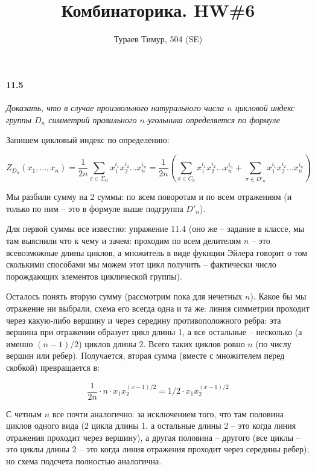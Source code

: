 \documentclass[russian]{article}
\begin{document}
\title{Комбинаторика. HW\#6}
\author{Тураев Тимур, 504 (SE)}
\maketitle

\paragraph*{11.5}

\textit{Доказать, что в случае произвольного натурального числа $n$ цикловой индекс группы $D_n$ симметрий правильного $n$-угольника определяется по формуле}

Запишем цикловый индекс по определению:

\[
Z_{D_n}(x_1, \ldots, x_n) = \frac{1}{2n} \sum_{\sigma \in \Sigma_G} x_1^{i_1} x_2^{i_2} \ldots x_n^{i_n} = \frac{1}{2n} \left(\sum_{\sigma \in C_n} x_1^{i_1} x_2^{i_2} \ldots x_n^{i_n} + \sum_{\sigma \in D'_n} x_1^{i_1} x_2^{i_2} \ldots x_n^{i_n} \right)
\] 

Мы разбили сумму на 2 суммы: по всем поворотам и по всем отражениям (и только по ним -- это в формуле выше подгруппа $D'_n$). 

Для первой суммы все известно: упражение 11.4 (оно же -- задание в классе, мы там выяснили что к чему и зачем: проходим по всем делителям $n$ -- это всевозможные длины циклов, а множитель в виде фукнции Эйлера говорит о том сколькими способами мы можем этот цикл получить -- фактически число порождающих элементов циклической группы).

Осталось понять вторую сумму (рассмотрим пока для нечетных $n$). Какое бы мы отражение ни выбрали, схема его всегда одна и та же: линия симметрии проходит через какую-либо вершину и через середину противоположного ребра: эта вершина при отражении образует цикл длины 1, а все остальные -- несколько (а именно $(n-1)/2$) циклов длины 2. Всего таких циклов ровно $n$ (по числу вершин или ребер). Получается, вторая сумма (вместе с множителем перед скобкой) превращается в:

\[
\frac{1}{2n} \cdot n \cdot x_1 x_2^{(x-1)/2} = 1/2 \cdot x_1 x_2^{(x-1)/2}
\]

С четным $n$ все почти аналогично: за исключением того, что там половина циклов одного вида (2 цикла длины 1, а остальные длины 2 -- это когда линия отражения проходит через вершину), а другая половина -- другого (все циклы -- это циклы длины 2 -- это когда линия отражения проходит через середины ребер); но схема подсчета полностью аналогична.
\end{document}
